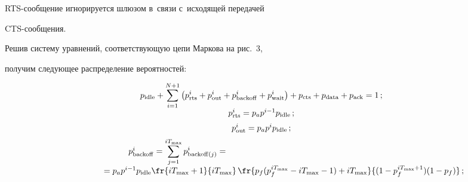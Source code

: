 RTS-со\-об\-ще\-ние игнорируется шлюзом в~связи с~исходящей передачей 


CTS-сообщения.





    Решив систему уравнений, соответствующую цепи Маркова на рис.~3, 


получим следующее распределение вероятностей:


\begin{equation*}


\begin{array}{c}


p_{\mathrm{idle}} +\displaystyle \sum\limits_{i=1}^{N+1} \left( p^i_{\mathrm{rts}} +p^i_{\mathrm{out}} 


+p^i_{\mathrm{backoff}}+p^i_{\mathrm{wait}}\right) +


p_{\mathrm{cts}} +p_{\mathrm{data}}+p_{\mathrm{ack}}=1\,;\\[6pt]


p^i_{\mathrm{rts}} = p_a p^{i-1} p_{\mathrm{idle}}\,;\\[6pt]


p^i_{\mathrm{out}} = p_a p^i p_{\mathrm{idle}}\,;\\[6pt]


\hspace*{-35mm}p^i_{\mathrm{backoff}} = 


\displaystyle \sum\limits_{j=1}^{i T_{\max}} p^i_{\mathrm{backoff}(j)} = {}\hspace*{35mm}\\[6pt]


\hspace*{18mm}{}=


p_a p^{i-1} p_{\mathrm{idle}} \fr{ iT_{\max}+1}{ iT_{\max}}\, \fr{p_f(p_f^{iT_{\max}}-


iT_{\max}-1)+iT_{\max}}{(1-p_f^{iT_{\max}+1})(1-p_f)}\,;


\end{array}




\end{equation*}





